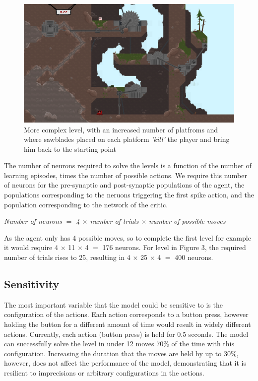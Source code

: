 \documentclass[10pt]{article}
\begin{document}
    \begin{figure}[ht!]
    \centering
    \includegraphics[width=155mm]{./bladeLevel.png}
    \caption{More complex level, with an increased number of platfroms and where sawblades placed on each platform \textit{'kill'} the player and bring him back to the starting point \label{overflow}}
    \end{figure}

    The number of neurons required to solve the levels is a function of the number of learning episodes, times the number of possible actions. We require this number of neurons for the pre-synaptic and post-synaptic populations of the agent, the populations corresponding to the neruons triggering the first spike action, and the population corresponding to the network of the critic.
    
    \begin{center}
        \textit{Number of neurons $=$ 4 $\times$ number of trials $\times$ number of possible moves}
    \end{center}

    As the agent only has 4 possible moves, so to complete the first level for example it would require 4 $\times$ 11 $\times$ 4 $=$ 176 neurons. For level in Figure 3, the required number of trials rises to 25, resulting in 4 $\times$ 25 $\times$ 4 $=$ 400 neurons.

    \subsection{Sensitivity}

    The most important variable that the model could be sensitive to is the configuration of the actions. Each action corresponds to a button press, however holding the button for a different amount of time would result in widely different actions. Currently, each action (button press) is held for 0.5 seconds. The model can successfully solve the level in under 12 moves 70\% of the time with this configuration. Increasing the duration that the moves are held by up to 30\%, however, does not affect the performance of the model, demonstrating that it is resilient to imprecisions or arbitrary configurations in the actions.
\end{document}
